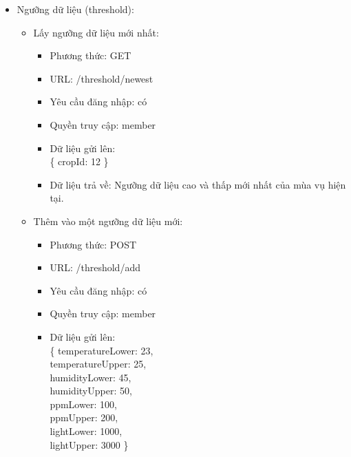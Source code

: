 \documentclass[a4paper,12pt,oneside]{article}
\begin{document}
\begin{itemize}
\begin{itemize}
\begin{itemize}
	\end{itemize} 
\end{itemize}

\item Ngưỡng dữ liệu (threshold):
\begin{itemize}
\item Lấy ngưỡng dữ liệu mới nhất:
\begin{itemize}
	\item Phương thức: GET
	\item URL: /threshold/newest
	\item Yêu cầu đăng nhập: có
	\item Quyền truy cập: member
	\item Dữ liệu gửi lên:\\ 
		\{
  			cropId: 12
		\}
	\item Dữ liệu trả về: Ngưỡng dữ liệu cao và thấp mới nhất của mùa vụ hiện tại.
	\end{itemize} 
	
\item Thêm vào một ngưỡng dữ liệu mới:
\begin{itemize}
	\item Phương thức: POST
	\item URL: /threshold/add
	\item Yêu cầu đăng nhập: có
	\item Quyền truy cập: member
	\item Dữ liệu gửi lên:\\ 
		\{
  			temperatureLower: 23,\\
  			temperatureUpper: 25,\\
  			humidityLower: 45,\\
  			humidityUpper: 50,\\
  			ppmLower: 100,\\
  			ppmUpper: 200,\\
  			lightLower: 1000,\\
  			lightUpper: 3000
		\}
	\end{itemize} 
	
	
\end{itemize}


\end{itemize}
\end{document}
